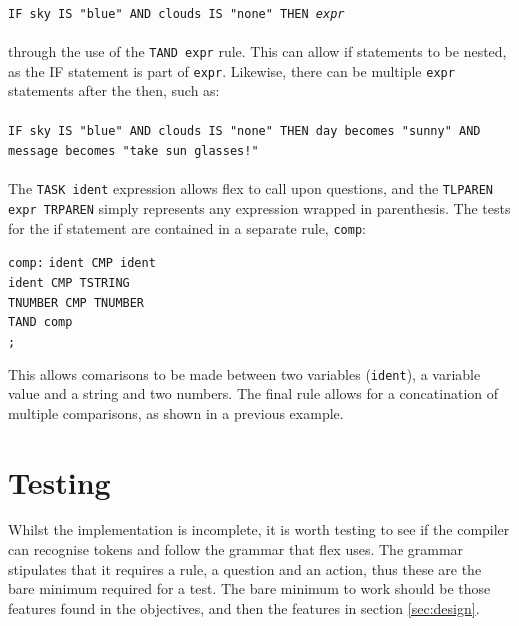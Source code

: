 \documentclass[12pt]{report}
\begin{document}
\\
\texttt{IF sky IS "blue" AND clouds IS "none" THEN \textit{expr}}\\
\\
through the use of the \texttt{TAND expr} rule.  This can allow if statements to be nested, as the IF statement is part of \texttt{expr}. Likewise, there can be multiple \texttt{expr} statements after the then, such as:\\
\\
\texttt{IF sky IS "blue" AND clouds IS "none" THEN day becomes "sunny" AND message becomes "take sun glasses!"}\\
\\
The \texttt{TASK ident} expression allows flex to call upon questions, and the \texttt{TLPAREN expr TRPAREN} simply represents any expression wrapped in parenthesis.
The tests for the if statement are contained in a separate rule, \texttt{comp}:\\
\begin{tabbing}
\texttt{comp:} \= \texttt{ident CMP ident}\\
\> \texttt{\textbar \space ident CMP TSTRING}\\
\> \texttt{\textbar \space TNUMBER CMP TNUMBER}\\
\> \texttt{\textbar \space TAND comp}\\
\> \texttt{;}\\
\end{tabbing}
This allows comarisons to be made between two variables (\texttt{ident}), a variable value and a string and two numbers.  The final rule allows for a concatination of multiple comparisons, as shown in a previous example.
\section{Testing}
Whilst the implementation is incomplete, it is worth testing to see if the compiler can recognise tokens and follow the grammar that flex uses.  The grammar stipulates that it requires a rule, a question and an action, thus these are the bare minimum required for a test.  The bare minimum to work should be those features found in the objectives, and then the features in section \ref{sec:design}.\\
\\
\end{document}
